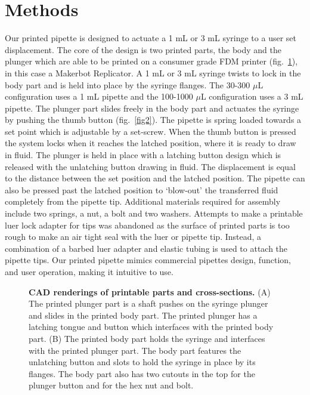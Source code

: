 \documentclass[10pt,letterpaper]{article}
\begin{document}
\section*{Methods}
Our printed pipette is designed to actuate a 1 mL or 3 mL syringe to a user set displacement.
The core of the design is two printed parts, the body and the plunger which are able to be printed on a consumer grade FDM printer (fig.~\ref{fig1}), in this case a Makerbot Replicator.
A 1 mL or 3 mL syringe twists to lock in the body part and is held into place by the syringe flanges.
The 30-300 $\mu$L configuration uses a 1 mL pipette and the 100-1000 $\mu$L configuration uses a 3 mL pipette.
The plunger part slides freely in the body part and actuates the syringe by pushing the thumb button (fig.~\ref{fig2}). 
The pipette is spring loaded towards a set point which is adjustable by a set-screw.
When the thumb button is pressed the system locks when it reaches the latched position, where it is ready to draw in fluid.
The plunger is held in place with a latching button design which is released with the unlatching button drawing in fluid.
The displacement is equal to the distance between the set position and the latched position.
The pipette can also be pressed past the latched position to `blow-out' the transferred fluid completely from the pipette tip.   
Additional materials required for assembly include two springs, a nut, a bolt and two washers.
Attempts to make a printable luer lock adapter for tips was abandoned as the surface of printed parts is too rough to make an air tight seal with the luer or pipette tip.
Instead, a combination of a barbed luer adapter and elastic tubing is used to attach the pipette tips.
Our printed pipette mimics commercial pipettes design, function, and user operation, making it intuitive to use.

\begin{figure}
	\caption{
		{\bf CAD renderings of printable parts and cross-sections.} (A) The printed plunger part is a shaft pushes on the syringe plunger and slides in the printed body part. The printed plunger has a latching tongue and button which interfaces with the printed body part. (B) The printed body part holds the syringe and interfaces with the printed plunger part. The body part features the unlatching button and slots to hold the syringe in place by its flanges. The body part also has two cutouts in the top for the plunger button and for the hex nut and bolt.
	}
	\label{fig1}
\end{figure}
\end{document}
